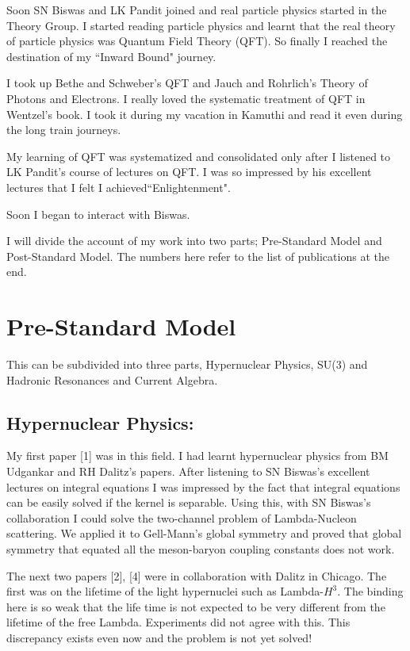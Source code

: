 Soon SN Biswas and LK Pandit joined and real particle physics started in 
the Theory Group. I started reading particle physics and learnt that the 
real theory of particle physics was Quantum Field Theory (QFT). So 
finally I reached the destination of my ``Inward Bound" journey.
\smallskip

I took up Bethe and Schweber's QFT and Jauch and Rohrlich's Theory of 
Photons and Electrons. I really loved the systematic treatment of QFT in 
Wentzel's book. I took it during my vacation in Kamuthi and read it even 
during the long train journeys.
\smallskip

My learning of QFT was systematized and consolidated only after I 
listened to LK Pandit's course of lectures on QFT. I was so impressed by 
his excellent lectures that I felt I achieved\break ``Enlightenment".
\smallskip

Soon I began to interact with Biswas.
\smallskip

I will divide the account of my work into two parts; Pre-Standard Model 
and Post-Standard Model. The numbers here refer to the list of 
publications at the end.

\section*{Pre-Standard Model}

This can be subdivided into three parts, Hypernuclear Physics, 
SU(3) and Hadronic Resonances and Current Algebra.
\newpage

\subsection*{Hypernuclear Physics:}

My first paper [1] was in this field. I had learnt hypernuclear physics 
from BM Udgankar and RH Dalitz's papers. After liste\-ning to SN Biswas's 
excellent lectures on integral equations I was impressed by the fact 
that integral equations can be easily solved if the kernel is separable. 
Using this, with SN Biswas's collaboration I could solve the two-channel 
problem of Lambda-Nucleon scattering. We applied it to Gell-Mann's 
global symmetry and proved that global symmetry that equated all the 
meson-baryon coupling constants does not work.

The next two papers [2], [4] were in collaboration with Dalitz in Chicago. 
The first was on the lifetime of the light hypernuclei such as 
Lambda-$H^3$. The binding here is so weak that the life time is not 
expected to be very different from the lifetime of the free Lambda. 
Experiments did not agree with this. This discrepancy exists even now 
and the problem is not yet solved!

